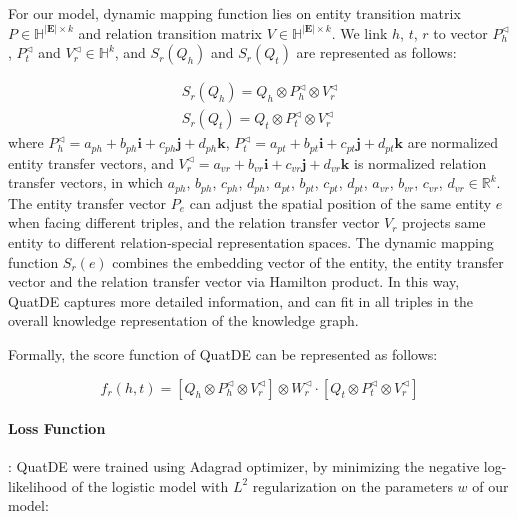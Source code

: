 \documentclass[letterpaper]{article} \usepackage{aaai20}  \usepackage{times}  \usepackage{helvet} \usepackage{courier}  \usepackage[hyphens]{url}  \usepackage{graphicx} \usepackage{lineno,hyperref,amsmath,amssymb}
\begin{document}
For our model, dynamic mapping function lies on entity transition matrix $P \in \mathbb{H}^{|\boldsymbol{E}| \times k}$ and relation transition matrix $V \in \mathbb{H}^{|\boldsymbol{E}| \times k}$. We link $h$, $t$, $r$ to vector $P_h^{\triangleleft}$, $P_t^{\triangleleft}$ and $V_r^{\triangleleft} \in \mathbb{H}^k$, and $S_r (Q_h )$ and $S_r (Q_t )$ are represented as follows:

\begin{equation}
\begin{array}{l}
S_{r}\left(Q_{h}\right)=Q_{h} \otimes P_{h}^{\triangleleft} \otimes V_{r}^{\triangleleft} \\
S_{r}\left(Q_{t}\right)=Q_{t} \otimes P_{t}^{\triangleleft} \otimes V_{r}^{\triangleleft}
\end{array}
\end{equation}where $P_h^{\triangleleft}=a_{ph}+b_{ph} \mathbf{i}+c_{ph} \mathbf{j}+d_{ph} \mathbf{k}$, $P_t^{\triangleleft}=a_{pt}+b_{pt} \mathbf{i}+c_{pt} \mathbf{j}+d_{pt} \mathbf{k}$ are normalized entity transfer vectors, and $V_r^{\triangleleft}=a_{vr}+b_{vr} \mathbf{i}+c_{vr} \mathbf{j}+d_{vr} \mathbf{k}$ is normalized relation transfer vectors, in which $a_{ph}$, $b_{ph}$, $c_{ph}$, $d_{ph}$, $a_{pt}$, $b_{pt}$, $c_{pt}$, $d_{pt}$, $a_{vr}$, $b_{vr}$, $c_{vr}$, $d_{vr} \in \mathbb{R}^k$. The entity transfer vector $P_e$ can adjust the spatial position of the same entity $e$ when facing different triples, and the relation transfer vector $V_r$ projects same entity to different relation-special representation spaces. The dynamic mapping function $S_r (e)$ combines the embedding vector of the entity, the entity transfer vector and the relation transfer vector via Hamilton product. In this way, QuatDE captures more detailed information, and can fit in all triples in the overall knowledge representation of the knowledge graph.

Formally, the score function of QuatDE can be represented as follows:

\begin{equation}
f_{r}(h, t)=\left[Q_{h} \otimes P_{h}^{\triangleleft} \otimes V_{r}^{\triangleleft}\right] \otimes W_{r}^{\triangleleft} \cdot\left[Q_{t} \otimes P_{t}^{\triangleleft} \otimes V_{r}^{\triangleleft}\right]
\end{equation}

\paragraph{\textbf{Loss Function}}:
QuatDE were trained using Adagrad optimizer, by minimizing the negative log-likelihood of the logistic model with $L^2$ regularization on the parameters $w$ of our model:
\end{document}

